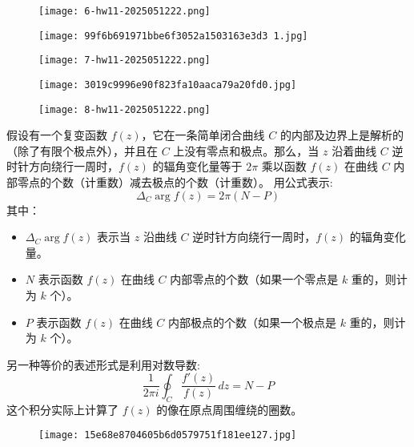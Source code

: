 \begin{exercise}
\begin{figure}[H]
\centering
\texttt{[image: 6-hw11-2025051222.png]}
\label{}
\end{figure}
\end{exercise}
\begin{figure}[H]
\centering
\texttt{[image: 99f6b691971bbe6f3052a1503163e3d3 1.jpg]}
\label{}
\end{figure}

\begin{exercise}
\begin{figure}[H]
\centering
\texttt{[image: 7-hw11-2025051222.png]}
\label{}
\end{figure}
\end{exercise}
\begin{figure}[H]
\centering
\texttt{[image: 3019c9996e90f823fa10aaca79a20fd0.jpg]}
\label{}
\end{figure}

\begin{exercise}
\begin{figure}[H]
\centering
\texttt{[image: 8-hw11-2025051222.png]}
\label{}
\end{figure}
\end{exercise}
假设有一个复变函数 $f(z)$，它在一条简单闭合曲线 $C$ 的内部及边界上是解析的（除了有限个极点外），并且在 $C$ 上没有零点和极点。那么，当 $z$ 沿着曲线 $C$ 逆时针方向绕行一周时，$f(z)$ 的辐角变化量等于 $2\pi$ 乘以函数 $f(z)$ 在曲线 $C$ 内部零点的个数（计重数）减去极点的个数（计重数）。
用公式表示:
\[
\Delta_C \arg f(z) = 2\pi(N - P)
\]
其中：

\begin{itemize}
	\item $\Delta_C \arg f(z)$ 表示当 $z$ 沿曲线 $C$ 逆时针方向绕行一周时，$f(z)$ 的辐角变化量。
	\item $N$ 表示函数 $f(z)$ 在曲线 $C$ 内部零点的个数（如果一个零点是 $k$ 重的，则计为 $k$ 个）。
	\item $P$ 表示函数 $f(z)$ 在曲线 $C$ 内部极点的个数（如果一个极点是 $k$ 重的，则计为 $k$ 个）。
\end{itemize}

另一种等价的表述形式是利用对数导数:
\[
\frac{1}{2\pi i} \oint_C \frac{f'(z)}{f(z)} \, dz = N - P
\]
这个积分实际上计算了 $f(z)$ 的像在原点周围缠绕的圈数。

\begin{figure}[H]
\centering
\texttt{[image: 15e68e8704605b6d0579751f181ee127.jpg]}
\label{}
\end{figure}
